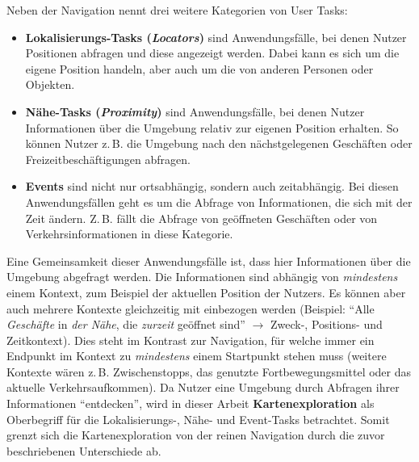 Neben der Navigation nennt \citeauthor{Reichenbacher2001} drei weitere Kategorien von User Tasks:
\begin{itemize}
    \item \textbf{Lokalisierungs-Tasks (\emph{Locators})} sind Anwendungsfälle, bei denen Nutzer Positionen abfragen und diese angezeigt werden.
    Dabei kann es sich um die eigene Position handeln, aber auch um die von anderen Personen oder Objekten.
    
    \item \textbf{Nähe-Tasks (\emph{Proximity})} sind Anwendungsfälle, bei denen Nutzer Informationen über die Umgebung relativ zur eigenen Position erhalten.
    So können Nutzer z.\,B. die Umgebung nach den nächstgelegenen Geschäften oder Freizeitbeschäftigungen abfragen.
    
    \item \textbf{Events} sind nicht nur ortsabhängig, sondern auch zeitabhängig.
    Bei diesen Anwendungsfällen geht es um die Abfrage von Informationen, die sich mit der Zeit ändern.
    Z.\,B. fällt die Abfrage von geöffneten Geschäften oder von Verkehrsinformationen in diese Kategorie.
\end{itemize}

Eine Gemeinsamkeit dieser Anwendungsfälle ist, dass hier Informationen über die Umgebung abgefragt werden.
Die Informationen sind abhängig von \emph{mindestens} einem Kontext, zum Beispiel der aktuellen Position der Nutzers.
Es können aber auch mehrere Kontexte gleichzeitig mit einbezogen werden (Beispiel: \enquote{Alle \emph{Geschäfte} in \emph{der Nähe}, die \emph{zurzeit} geöffnet sind} $\rightarrow$ Zweck-, Positions- und Zeitkontext).
Dies steht im Kontrast zur Navigation, für welche immer ein Endpunkt im Kontext zu \emph{mindestens} einem Startpunkt stehen muss (weitere Kontexte wären z.\,B. Zwischenstopps, das genutzte Fortbewegungsmittel oder das aktuelle Verkehrsaufkommen).
Da Nutzer eine Umgebung durch Abfragen ihrer Informationen \enquote{entdecken}, wird in dieser Arbeit \textbf{Kartenexploration} als Oberbegriff für die Lokalisierungs-, Nähe- und Event-Tasks betrachtet.
Somit grenzt sich die Kartenexploration von der reinen Navigation durch die zuvor beschriebenen Unterschiede ab.

